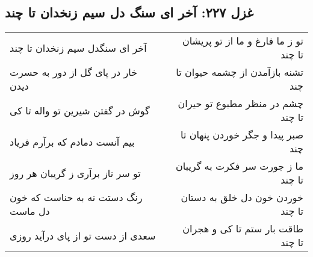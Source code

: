 \begin{center}
\section*{غزل ۲۲۷: آخر ای سنگ دل سیم زنخدان تا چند}
\label{sec:227}
\begin{longtable}{l p{0.5cm} r}
آخر ای سنگدل سیم زنخدان تا چند
&&
تو ز ما فارغ و ما از تو پریشان تا چند
\\
خار در پای گل از دور به حسرت دیدن
&&
تشنه بازآمدن از چشمه حیوان تا چند
\\
گوش در گفتن شیرین تو واله تا کی
&&
چشم در منظر مطبوع تو حیران تا چند
\\
بیم آنست دمادم که برآرم فریاد
&&
صبر پیدا و جگر خوردن پنهان تا چند
\\
تو سر ناز برآری ز گریبان هر روز
&&
ما ز جورت سر فکرت به گریبان تا چند
\\
رنگ دستت نه به حناست که خون دل ماست
&&
خوردن خون دل خلق به دستان تا چند
\\
سعدی از دست تو از پای درآید روزی
&&
طاقت بار ستم تا کی و هجران تا چند
\\
\end{longtable}
\end{center}
